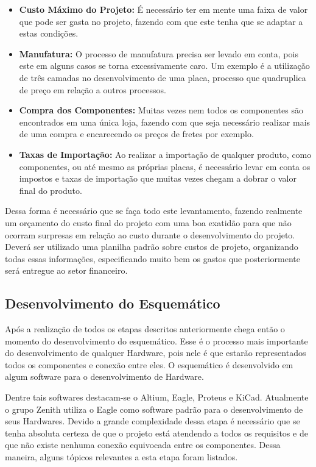 \begin{itemize}
    \item \textbf{Custo Máximo do Projeto:}
    É necessário ter em mente uma faixa de valor que pode ser gasta no projeto, fazendo com que este tenha que se adaptar a estas condições.
    \item \textbf{Manufatura:}
    O processo de manufatura precisa ser levado em conta, pois este em alguns casos se torna excessivamente caro. Um exemplo é a utilização de três camadas no desenvolvimento de uma placa, processo que quadruplica de preço em relação a outros processos.
    \item \textbf{Compra dos Componentes:}
    Muitas vezes nem todos os componentes são encontrados em uma única loja, fazendo com que seja necessário realizar mais de uma compra e encarecendo os preços de fretes por exemplo.
    \item \textbf{Taxas de Importação:}
    Ao realizar a importação de qualquer produto, como componentes, ou até mesmo as próprias placas, é necessário levar em conta os impostos e taxas de importação que muitas vezes chegam a dobrar o valor final do produto.
\end{itemize}

Dessa forma é necessário que se faça todo este levantamento, fazendo realmente um orçamento do custo final do projeto com uma boa exatidão para que não ocorram surpresas em relação ao custo durante o desenvolvimento do projeto. Deverá ser utilizado uma planilha padrão sobre custos de projeto, organizando todas essas informações, especificando muito bem os gastos que posteriormente será entregue ao setor financeiro.

\subsection{Desenvolvimento do Esquemático}

Após a realização de todos os etapas descritos anteriormente chega então o momento do desenvolvimento do esquemático. Esse é o processo mais importante do desenvolvimento de  qualquer Hardware, pois nele é que estarão representados todos os componentes e conexão entre eles. O esquemático é desenvolvido em algum software para o desenvolvimento de Hardware. 

Dentre tais softwares destacam-se o Altium, Eagle, Proteus e KiCad. Atualmente o grupo Zenith utiliza o Eagle como software padrão para o desenvolvimento de seus Hardwares.
Devido a grande complexidade dessa etapa é necessário que se tenha absoluta certeza de que o projeto está atendendo a todos os requisitos e de que não existe nenhuma conexão equivocada entre os componentes. Dessa maneira, alguns tópicos relevantes a esta etapa foram listados.

